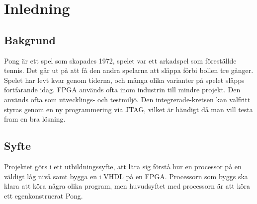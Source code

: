 \iffalse
1. Inledning
Bakgrund, syfte, källor
\fi

\section{Inledning}

\subsection{Bakgrund}
	Pong är ett spel som skapades 1972, spelet var ett arkadspel som föreställde tennis. Det går ut på att få den andra spelarna att släppa förbi bollen tre gånger. Spelet har levt kvar genom tiderna, och många olika varianter på spelet släpps fortfarande idag.
	FPGA används ofta inom industrin till mindre projekt. Den används ofta som utvecklings- och testmiljö. Den integrerade-kretsen kan valfritt styras genom en ny programmering via JTAG, vilket är händigt då man vill testa fram en bra lösning. 

\subsection{Syfte}
	Projektet görs i ett utbildningssyfte, att lära sig förstå hur en processor på en väldigt låg nivå samt bygga en i VHDL på en FPGA. Processorn som byggs ska klara att köra några olika program, men huvudsyftet med processorn är att köra ett egenkonstruerat Pong. 
\iffalse
\subsection{Källor}
\fi